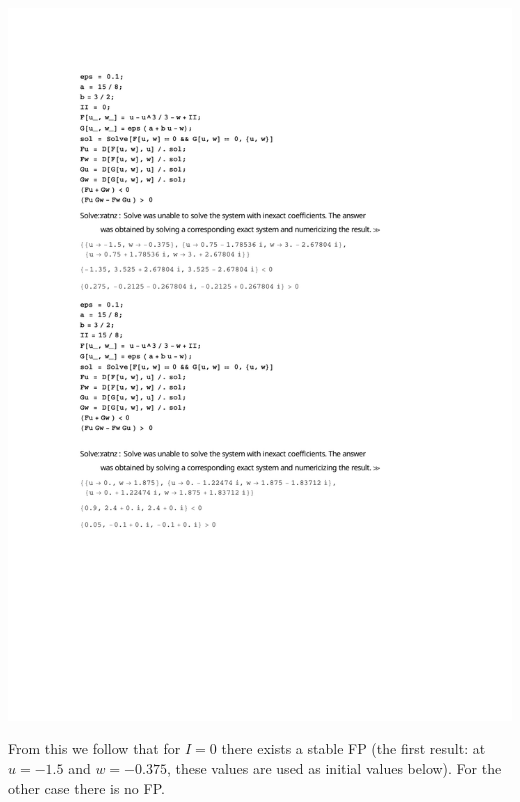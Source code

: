 \documentclass[12pt]{article}
\newenvironment{exercise}[2][Exercise]{\begin{trivlist}
\item[\hskip \labelsep {\bfseries #1}\hskip \labelsep {\bfseries #2.}]}{\end{trivlist}}
\newcommand{\added}[1]{
		{#1}
}
\newcommand{\addedfragile}[1]{{\color{green!50!black}{#1}}{}}
\begin{document}
\begin{exercise}{3.1}
\begin{enumerate}
	\includegraphics[width=6.5in]{excercise_31}
	\added{From this we follow that for $I=0$ there exists a stable FP (the first result: at $u= -1.5$ and $w=-0.375$, these values are used as initial values below). For the other case there is no FP.}
\end{enumerate}

\end{exercise}
\end{document}
